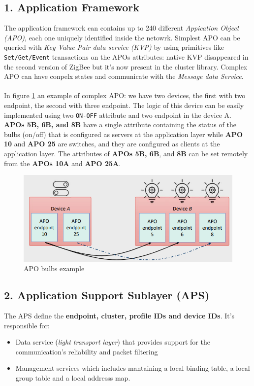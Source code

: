 \documentclass[10pt,a4paper]{report}
\theoremstyle{definition}
\begin{document}
\subsection{1. Application Framework}\label{sec:1-application-framework}
The application framework can contains up to 240 different \textit{Appication Object (APO)}, each one uniquely identified inside the netowrk.
Simplest APO can be queried with \textit{Key Value Pair data service (KVP)} by using primitives like \texttt{Set/Get/Event} transactions on the APOs attributes: native KVP disappeared in the second version of ZigBee but it’s now present in the cluster library.
Complex APO can have conpelx states and communicate with the \textit{Message data Service}. \\\\
 In figure \ref{APO-ex1} an example of complex APO: we have two devices, the first with two endpoint, the second with three endpoint. The logic of this device can be easily implemented using two \texttt{ON-OFF} attribute and two endpoint in the device A.
\textbf{APOs 5B, 6B, and 8B} have a single attribute containing the status of the bulbs (on/off) that is configured as servers at the application layer while \textbf{APO 10} and \textbf{APO 25} are switches, and they are configured as clients at the application layer. The attributes of \textbf{APOs 5B, 6B}, and \textbf{8B} can be set remotely from the \textbf{APOs 10A} and  \textbf{APO 25A}.

\begin{figure}[h]
	\centering\includegraphics[scale=0.40]{images/Pasted image 20230311123327.png}
	\caption{APO bulbs example}
	\label{APO-ex1}
\end{figure}


\subsection{2. Application Support Sublayer (APS)}\label{sec:2-application-support-sublayer-aps}
The APS define the \textbf{endpoint, cluster, profile IDs and device IDs}. It's responsible for:
\begin{itemize}
	\item 
	Data service (\textit{light transport layer}) that provides support for the communication's reliability and packet filtering
	\item 
	Management services which includes mantaining a local binding table, a local group table and a local addresss map.
\end{itemize}
\end{document}
